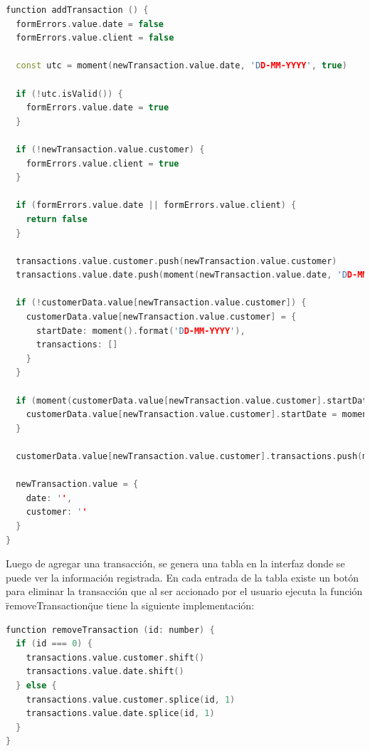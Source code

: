 \begin{lstlisting}[language=C++, caption=addTransaction en index.vue]
function addTransaction () {
  formErrors.value.date = false
  formErrors.value.client = false

  const utc = moment(newTransaction.value.date, 'DD-MM-YYYY', true)

  if (!utc.isValid()) {
    formErrors.value.date = true
  }

  if (!newTransaction.value.customer) {
    formErrors.value.client = true
  }

  if (formErrors.value.date || formErrors.value.client) {
    return false
  }

  transactions.value.customer.push(newTransaction.value.customer)
  transactions.value.date.push(moment(newTransaction.value.date, 'DD-MM-YYYY').format('DD-MM-YYYY'))

  if (!customerData.value[newTransaction.value.customer]) {
    customerData.value[newTransaction.value.customer] = {
      startDate: moment().format('DD-MM-YYYY'),
      transactions: []
    }
  }

  if (moment(customerData.value[newTransaction.value.customer].startDate, 'DD-MM-YYYY') > moment(newTransaction.value.date, 'DD-MM-YYYY')) {
    customerData.value[newTransaction.value.customer].startDate = moment(newTransaction.value.date, 'DD-MM-YYYY').format('DD-MM-YYYY')
  }

  customerData.value[newTransaction.value.customer].transactions.push(moment(newTransaction.value.date, 'DD-MM-YYYY').format('DD-MM-YYYY'))

  newTransaction.value = {
    date: '',
    customer: ''
  }
}
\end{lstlisting}	

Luego de agregar una transacción, se genera una tabla en la interfaz donde se puede ver la información registrada. En cada entrada de la tabla existe un botón para eliminar la transacción que al ser accionado por el usuario ejecuta la función \"removeTransaction\" que tiene la siguiente implementación:

\begin{lstlisting}[language=C++, caption=removeTransaction en index.vue]
function removeTransaction (id: number) {
  if (id === 0) {
    transactions.value.customer.shift()
    transactions.value.date.shift()
  } else {
    transactions.value.customer.splice(id, 1)
    transactions.value.date.splice(id, 1)
  }
}
\end{lstlisting}	

